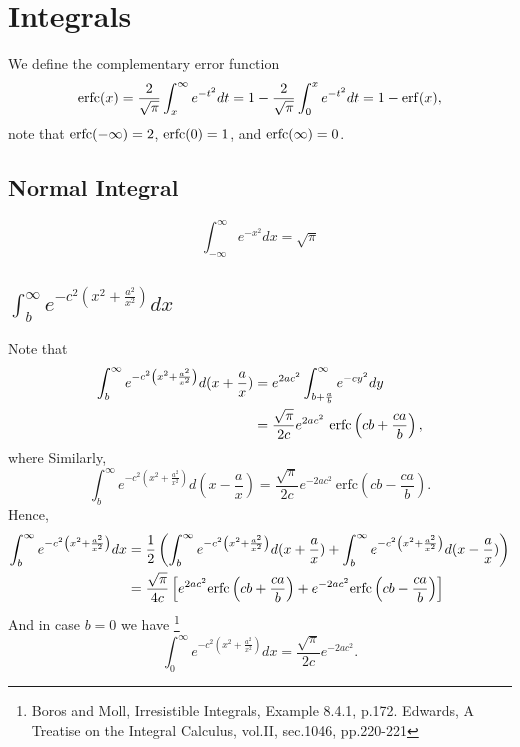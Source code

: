 
\chapter{Integrals}

We define the complementary error function
\begin{equation} \label{E:erfc}
  \operatorname*{erfc} (x) = \frac{2}{\sqrt{\pi}} \int_x^{\infty} e^{-t^2} dt 
            = 1 - \frac{2}{\sqrt{\pi}} \int_0^x e^{-t^2} dt = 1 - \operatorname*{erf} (x),
\end{equation}
note that $\operatorname*{erfc} (-\infty)=2$, $\operatorname*{erfc} (0)=1$, and $\operatorname*{erfc} (\infty)=0$.


\section{Normal Integral}
\begin{equation}
  \int_{-\infty}^{\infty} e^{-x^2} dx = \sqrt{\pi}
\end{equation}

\section{$\int_b^{\infty} e^{-c^2 ( x^2+\frac{a^2}{x^2} ) } dx $ }
Note that
\begin{align*}
  \int_b^{\infty} e^{-c^2 \left( x^2+\frac{a^2}{x^2} \right) } d(x+\frac{a}{x})
    &= e^{2ac^2} \int_{b+\frac{a}{b}}^{\infty} e^{-c y^2} dy  \notag  \\
    &= \frac{ \sqrt{\pi} }{2c} e^{2a c^2} 
       \ \mathrm{erfc} \left( c b + \frac{c a}{b} \right),
\end{align*}
where
Similarly,
\[
  \int_b^{\infty} e^{-c^2 \left( x^2+\frac{a^2}{x^2} \right) } d(x-\frac{a}{x})
    = \frac{ \sqrt{\pi} }{2c} e^{-2a c^2} 
      \ \mathrm{erfc} \left( c b - \frac{c a}{b} \right).
\]
Hence,
\begin{align}
  \int_b^{\infty} e^{-c^2 \left( x^2+\frac{a^2}{x^2} \right) } dx
    &= \frac{1}{2} \left(  
         \int_b^{\infty} e^{-c^2 \left( x^2+\frac{a^2}{x^2} \right) } d(x+\frac{a}{x})
         + \int_b^{\infty} e^{-c^2 \left( x^2+\frac{a^2}{x^2} \right) } d(x-\frac{a}{x})
       \right)  \notag  \\
    &= \frac{\sqrt{\pi}}{4c} 
       \left[ 
         e^{2a c^2} \mathrm{erfc} \left( c b + \frac{c a}{b} \right)
         + e^{-2a c^2} \mathrm{erfc} \left( c b - \frac{c a}{b} \right)
       \right]  \label{E:int1}
\end{align}
And in case $b=0$ we have
\footnote{Boros and Moll, Irresistible Integrals, Example 8.4.1, p.172.
  Edwards, A Treatise on the Integral Calculus, vol.II, sec.1046, pp.220-221}
\begin{equation}
  \int_0^{\infty} e^{-c^2 \left( x^2+\frac{a^2}{x^2} \right) } dx
    = \frac{\sqrt{\pi}}{2c} e^{-2a c^2}.
\end{equation}


